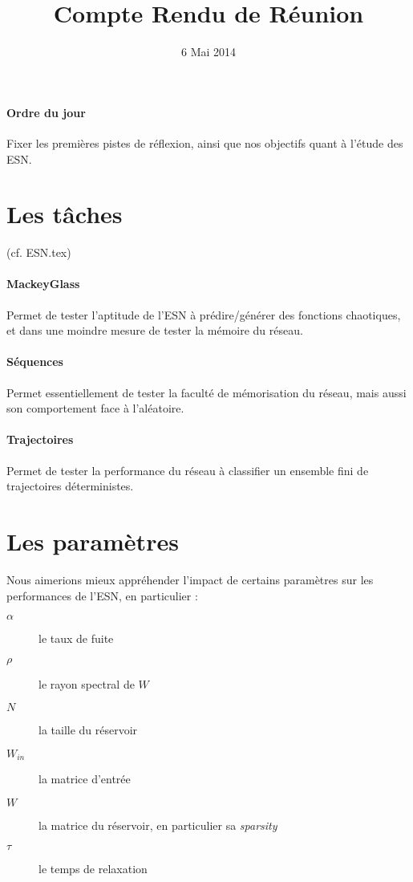 \documentclass[12pt]{article}
\title{Compte Rendu de Réunion}
\date{6 Mai 2014}
\author{}
\begin{document}
\maketitle

\paragraph{Ordre du jour}
Fixer les premières pistes de réflexion, ainsi que nos objectifs quant à l'étude des ESN.

\section{Les tâches}
(cf. ESN.tex)\\
\paragraph{MackeyGlass}
Permet de tester l'aptitude de l'ESN à prédire/générer des fonctions chaotiques, et dans une moindre mesure de tester la mémoire du réseau.
\paragraph{Séquences}
Permet essentiellement de tester la faculté de mémorisation du réseau, mais aussi son comportement face à l'aléatoire.
\paragraph{Trajectoires}
Permet de tester la performance du réseau à classifier un ensemble fini de trajectoires déterministes.

\section{Les paramètres}
Nous aimerions mieux appréhender l'impact de certains paramètres sur les performances de l'ESN, en particulier :
\begin{description}
\item[$\alpha$] le taux de fuite
\item[$\rho$] le rayon spectral de $W$
\item[$N$] la taille du réservoir
\item[$W_{in}$] la matrice d'entrée
\item[$W$] la matrice du réservoir, en particulier sa \textit{sparsity}
\item[$\tau$] le temps de relaxation
\end{description}
\end{document}
